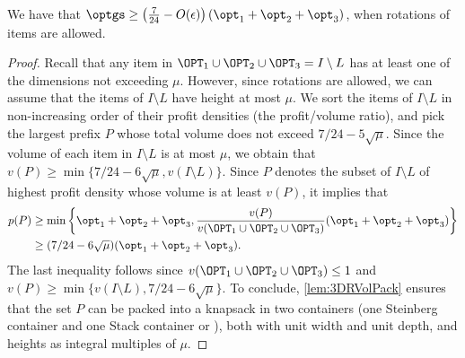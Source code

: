 
\begin{lemma}
\label{lem:rotationalgo}
    We have that $\optgs\ge \left(\frac{7}{24}-O(\epsilon)\right)(\opt_1+\opt_2+\opt_3)$, when rotations of items are allowed.
\end{lemma}
\begin{proof}
    Recall that any item in $\OPT_1\cup \OPT_2\cup \OPT_3=I\setminus L$ has at least one of the dimensions not exceeding $\mu$.
    However, since rotations are allowed, we can assume that the items of $I\setminus L$ have height at most $\mu$.
    We sort the items of $I\setminus L$ in non-increasing order of their profit densities (the profit/volume ratio), and
    pick the largest prefix $P$ whose total volume does not exceed $7/24-5\sqrt{\mu}$. Since the volume of each item
    in $I\setminus L$ is at most $\mu$, we obtain that $v(P)\ge \min\{7/24-6\sqrt{\mu},v(I\setminus L)\}$.
    Since $P$ denotes the subset of $I\setminus L$ of highest profit density whose volume is at least $v(P)$, it implies that
    \begin{align*}
        p(P)&\ge \min\left\{\opt_1+\opt_2+\opt_3,\frac{v(P)}{v(\OPT_1\cup\OPT_2\cup\OPT_3)}(\opt_1+\opt_2+\opt_3)\right\}\\
            &\ge (7/24-6\sqrt{\mu})(\opt_1+\opt_2+\opt_3).
    \end{align*} 
    The last inequality follows since $v(\OPT_1\cup\OPT_2\cup\OPT_3)\le 1$ and $v(P) \ge \min\{v(I\setminus L),7/24 -6\sqrt{\mu}\}$.
    To conclude, \cref{lem:3DRVolPack} ensures that the set $P$ can be packed into a knapsack in two containers (one Steinberg container and one Stack container or \LContainer),
    both with unit width and unit depth, and heights as integral multiples of $\mu$.
\end{proof}




